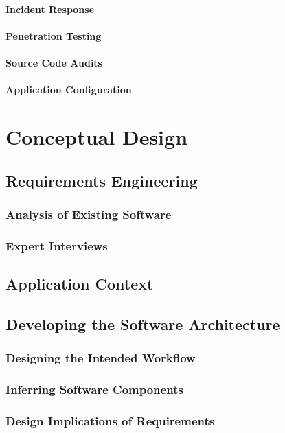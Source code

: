 \subsubsection{Incident Response}
\subsubsection{Penetration Testing}
\subsubsection{Source Code Audits}
\subsubsection{Application Configuration}

\chapter{Conceptual Design}
\section{Requirements Engineering}
\subsection{Analysis of  Existing Software}
\subsection{Expert Interviews}
\section{Application Context}
\section{Developing the Software Architecture}
\subsection{Designing the Intended Workflow}
\subsection{Inferring Software Components}
\subsection{Design Implications of Requirements}

